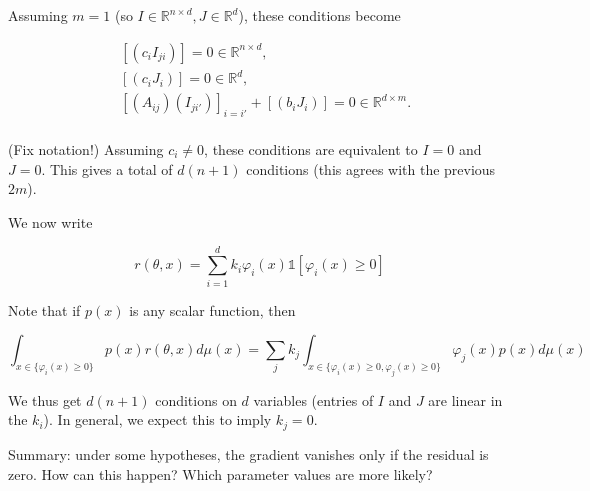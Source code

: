 \documentclass{article}
\newcommand{\RR}{\mathbb{R}}
\begin{document}
Assuming $m=1$ (so $I \in \RR^{n \times d}, J \in \RR^d$), these conditions
become

\begin{equation}
\begin{aligned}
& [(c_i I_{ji})] = 0 \in \RR^{n \times d},\\
& [(c_i J_{i})] = 0 \in \RR^d,\\
& [(A_{ij}) (I_{ji'})]_{i=i'} + [(b_i J_{i})] = 0 \in \RR^{d\times
m}.\\
\end{aligned}
\end{equation}

(Fix notation!) Assuming $c_i \ne 0$, these conditions are equivalent to $I = 0$
and $J = 0$. This gives a total of $d(n+1)$ conditions (this agrees with the previous $2m$).

We now write

\[
r(\theta,x) = \sum_{i=1}^d k_i \varphi_i(x) \mathds{1} [\varphi_i
(x) \ge 0]
\]

Note that if $p(x)$ is any scalar function, then

\[
\int_{x \in \{\varphi_i(x) \ge 0\}} p(x) r(\theta,x) d \mu(x) = 
\sum_j k_j \int_{x \in \{\varphi_i(x) \ge 0, \varphi_j(x) \ge 0\}}
\varphi_j(x) p(x) d\mu(x)
\]

We thus get $d(n+1)$ conditions on $d$ variables (entries of $I$ and $J$ are linear in the $k_i$). In general, we expect this to imply $k_j = 0$.

Summary: under some hypotheses, the gradient vanishes only if the residual is zero. How can this happen? Which parameter values are more likely?
\end{document}
